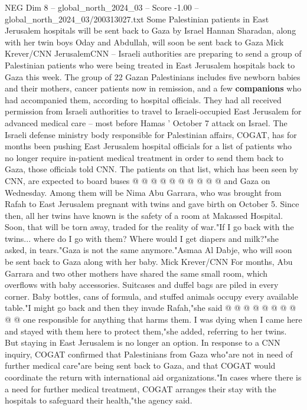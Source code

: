 \begin{textsample}{NEG Dim 8 – global\_north\_2024\_03 – Score -1.00 – global\_north\_2024\_03/200313027.txt}  \label{ex:f8_neg_444}
Some Palestinian patients in East Jerusalem hospitals will be sent back to Gaza by Israel Hannan Sharadan, along with her twin boys Oday and Abdullah, will soon be sent back to Gaza Mick Krever/CNN JerusalemCNN -- Israeli authorities are preparing to send a group of Palestinian patients who were being treated in East Jerusalem hospitals back to Gaza this week.
The group of 22 Gazan Palestinians includes five newborn babies and their mothers, cancer patients now in remission, and a few \textbf{companions} who had accompanied them, according to hospital officials.
They had all received permission from Israeli authorities to travel to Israeli-occupied East Jerusalem for advanced medical care -- most before Hamas ' October 7 attack on Israel.
The Israeli defense ministry body responsible for Palestinian affairs, COGAT, has for months been pushing East Jerusalem hospital officials for a list of patients who no longer require in-patient medical treatment in order to send them back to Gaza, those officials told CNN.
The patients on that list, which has been seen by CNN, are expected to board buses @ @ @ @ @ @ @ @ @ @ and Gaza on Wednesday.
Among them will be Nima Abu Garrara, who was brought from Rafah to East Jerusalem pregnant with twins and gave birth on October 5.
Since then, all her twins have known is the safety of a room at Makassed Hospital.
Soon, that will be torn away, traded for the reality of war."If I go back with the twins... where do I go with them?
Where would I get diapers and milk?"she asked, in tears."Gaza is not the same anymore."Asmaa Al Dabje, who will soon be sent back to Gaza along with her baby.
Mick Krever/CNN For months, Abu Garrara and two other mothers have shared the same small room, which overflows with baby accessories.
Suitcases and duffel bags are piled in every corner.
Baby bottles, cans of formula, and stuffed animals occupy every available table."I might go back and then they invade Rafah,"she said @ @ @ @ @ @ @ @ @ @ one responsible for anything that harms them.
I was dying when I came here and stayed with them here to protect them,"she added, referring to her twins.
But staying in East Jerusalem is no longer an option.
In response to a CNN inquiry, COGAT confirmed that Palestinians from Gaza who"are not in need of further medical care"are being sent back to Gaza, and that COGAT would coordinate the return with international aid organizations."In cases where there is a need for further medical treatment, COGAT arranges their stay with the hospitals to safeguard their health,"the agency said.

\end{textsample}
